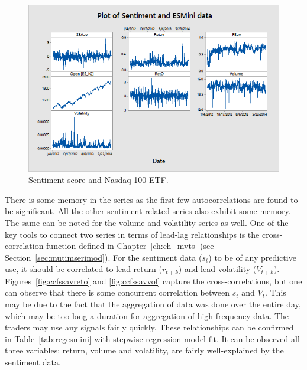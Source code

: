 	\begin{figure}[!ht]
	\centering
	\includegraphics[width=\textwidth]{chapters/chapter_news_an/figures/ch4sec4sentimentesmini} 
	\caption{Sentiment score and Nasdaq 100 ETF. \label{fig:sentimentesmini}}
	\end{figure}

There is some memory in the series as the first few autocorrelations are found to be significant. All the other sentiment related series also exhibit some memory. The same can be noted for the volume and volatility series as well. One of the key tools to connect two series in terms of lead-lag relationships is the cross-correlation function defined in Chapter~\ref{ch:ch_mvts} (see Section~\ref{sec:mutimserimod}). For the sentiment data ($s_t$) to be of any predictive use, it should be correlated to lead return ($r_{t+k}$) and lead volatility ($V_{t+k}$). Figures~\ref{fig:ccfssavreto} and \ref{fig:ccfssavvol} capture the cross-correlations, but one can observe that there is some concurrent correlation between $s_t$ and $V_t$. This may be due to the fact that the aggregation of data was done over the entire day, which may be too long a duration for aggregation of high frequency data. The traders may use any signals fairly quickly. These relationships can be confirmed in Table~\ref{tab:regesmini} with stepwise regression model fit. It can be observed all three variables: return, volume and volatility, are fairly well-explained by the sentiment data. 



